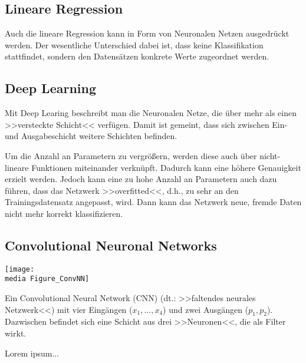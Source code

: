 \subsection{Lineare Regression}

Auch die lineare Regression kann in Form von Neuronalen Netzen ausgedrückt werden. Der wesentliche Unterschied dabei ist, dass keine Klassifikation stattfindet, sondern den Datensätzen konkrete Werte zugeordnet werden.


\subsection{Deep Learning}

Mit Deep Learing beschreibt man die Neuronalen Netze, die über mehr als einen >>versteckte Schicht<< verfügen. Damit ist gemeint, dass sich zwischen Ein- und Ausgabeschicht weitere Schichten befinden. 

Um die Anzahl an Parametern zu vergrößern, werden diese auch über nicht-lineare Funktionen miteinander verknüpft. Dadurch kann eine höhere Genauigkeit erzielt werden. Jedoch kann eine zu hohe Anzahl an Parametern auch dazu führen, dass das Netzwerk >>overfitted<<, d.h., zu sehr an den Trainingsdatensatz angepasst, wird. Dann kann das Netzwerk neue, fremde Daten nicht mehr korrekt klassifizieren.

\subsection{Convolutional Neuronal Networks}

\begin{dsafigure}
	\begin{center}
		\texttt{[image: \\media Figure\_ConvNN]}
		\caption{Ein Convolutional Neural Network (CNN) (dt.: >>faltendes neurales Netzwerk<<) mit vier Eingängen ($x_1, ..., x_4$) und zwei Ausgängen ($p_1, p_2$). Dazwischen befindet sich eine Schicht aus drei >>Neuronen<<, die als Filter wirkt.}
		\label{FigConvNN}
	\end{center}
\end{dsafigure}

Lorem ipsum...